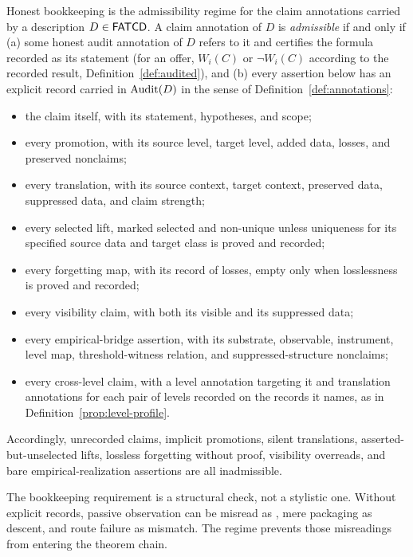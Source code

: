 \begin{definition}\label{prop:honest-bookkeeping}
Honest bookkeeping is the admissibility regime for the claim annotations
carried by a description \(D \in \mathsf{FATCD}{}\). A claim annotation of \(D\) is
\emph{admissible} if and only if (a) some honest audit annotation of
\(D\) refers to it and certifies the formula recorded as its statement (for an offer, \(W_i(C)\) or
\(\neg W_i(C)\) according to the recorded result, Definition~\ref{def:audited}),
and (b) every assertion below has an explicit record carried in \(\operatorname{Audit}\!\left(D\right)\)
in the sense of Definition~\ref{def:annotations}:
\begin{itemize}[topsep=2pt,itemsep=1pt]
  \item the claim itself, with its statement, hypotheses, and scope;
  \item every promotion, with its source level, target level, added data,
    losses, and preserved nonclaims;
  \item every translation, with its source context, target context,
    preserved data, suppressed data, and claim strength;
  \item every selected lift, marked selected and non-unique unless uniqueness for its specified source data and target class is proved and recorded;
  \item every forgetting map, with its record of losses, empty only when
    losslessness is proved and recorded;
  \item every visibility claim, with both its visible and its suppressed
    data;
  \item every empirical-bridge assertion, with its substrate, observable,
    instrument, level map, threshold-witness relation, and
    suppressed-structure nonclaims;
  \item every cross-level claim, with a level annotation targeting it and
    translation annotations for each pair of levels recorded on the records it
    names, as in Definition~\ref{prop:level-profile}.
\end{itemize}
Accordingly, unrecorded claims, implicit promotions, silent translations,
asserted-but-unselected lifts, lossless forgetting without proof,
visibility overreads, and bare empirical-realization assertions are all
inadmissible.
\end{definition}

\begin{remark}\label{rem:why-honest-bookkeeping}
The bookkeeping requirement is a structural check, not a stylistic
one. Without explicit records, passive observation can be misread as
\Psix{}, mere packaging as \Pone{} descent, and route failure as
\Pthree{} mismatch. The regime prevents those misreadings from
entering the theorem chain.
\end{remark}


